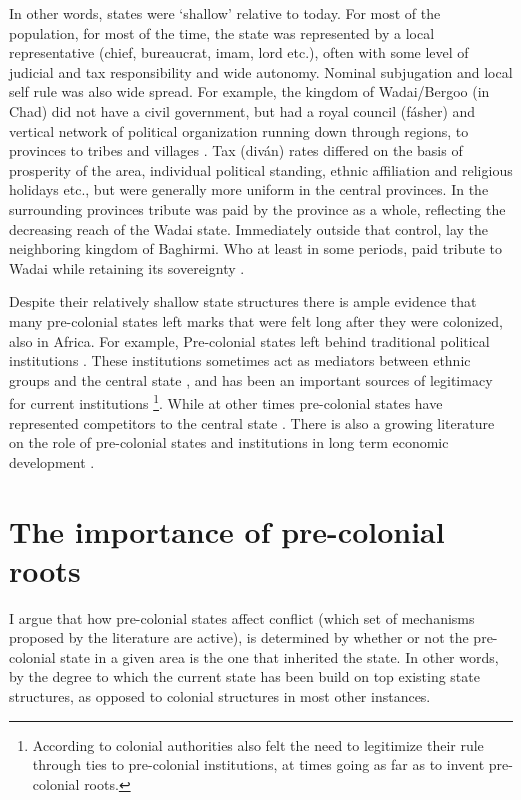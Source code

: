 \documentclass[12pt]{article}
\begin{document}
In other words, states were `shallow' relative to today. For most of the
population, for most of the time, the state was represented by a local
representative (chief, bureaucrat, imam, lord etc.), often with some level of
judicial and tax responsibility and wide autonomy. Nominal subjugation
and local self rule was also wide spread. For example, the kingdom of
Wadai/Bergoo (in Chad) did not have a civil government, but had a royal council
(fásher) and vertical network of political organization running down through
regions, to provinces to tribes and villages \citep{barth1857travels}. Tax (diván)
rates differed on the basis of prosperity of the area, individual political
standing, ethnic affiliation and religious holidays etc., but were generally more
uniform in the central provinces. In the surrounding provinces tribute was paid
by the province as a whole, reflecting the decreasing reach of the Wadai
state. Immediately outside that control, lay the neighboring kingdom of
Baghirmi. Who at least in some periods, paid tribute to Wadai while retaining
its sovereignty \citep{barth1857travels}.

Despite their relatively shallow state structures there is ample evidence that
many pre-colonial states left marks that were felt long after they were
colonized, also in Africa. For example, Pre-colonial states left behind
traditional political institutions \citep{Beall_2005, Holzinger_2020,
Neupert_Wentz_2021, Ubink_2008}. These institutions sometimes act as mediators
between ethnic groups and the central state \citep{boone2014property,
Englebert2002}, and has been an important sources of legitimacy for current
institutions \citep{Wig2016}\footnote{According to \citet{mamdani2018citizen}
	colonial authorities also felt the need to legitimize their rule through
	ties to pre-colonial institutions, at times going as far as to invent
pre-colonial roots.}. While at other times pre-colonial states have represented
competitors to the central state \citep{Herbst2014}. There is also a growing
literature on the role of pre-colonial states and institutions in long term
economic development \citep{Michalopoulos2018, Acemoglu2014, Gennaioli2007,
Bockstette2002}.

\section{The importance of pre-colonial roots}

I argue that how pre-colonial states affect conflict (which set of mechanisms
proposed by the literature are active), is determined by whether or not the
pre-colonial state in a given area is the one that inherited the state.
In other words, by the degree to which the current state has been build on top
existing state structures, as opposed to colonial structures in most other
instances. 
\end{document}
